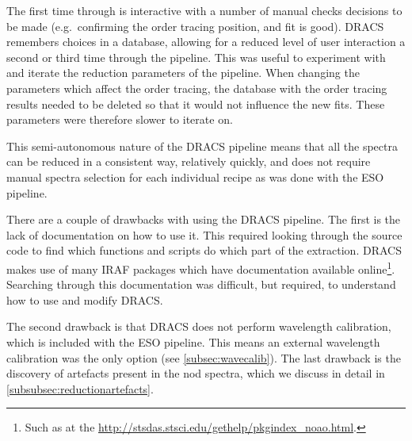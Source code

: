 The first time through is interactive with a number of manual checks decisions to be made (e.g.\ confirming the order tracing position, and fit is good).
{DRACS} remembers choices in a database, allowing for a reduced level of user interaction a second or third time through the pipeline.
This was useful to experiment with and iterate the reduction parameters of the pipeline.
When changing the parameters which affect the order tracing, the database with the order tracing results needed to be deleted so that it would not influence the new fits.
These parameters were therefore slower to iterate on.

This semi-autonomous nature of the {DRACS} pipeline means that all the spectra can be reduced in a consistent way, relatively quickly, and does not require manual spectra selection for each individual recipe as was done with the {ESO} pipeline.

There are a couple of drawbacks with using the {DRACS} pipeline.
The first is the lack of documentation on how to use it.
This required looking through the source code to find which functions and scripts do which part of the extraction.
{DRACS} makes use of many {IRAF} packages which have documentation available online\footnote{Such as at the \href{Space Telescope Science Institute}{http://stsdas.stsci.edu/gethelp/pkgindex\_noao.html}.}.
Searching through this documentation was difficult, but required, to understand how to use and modify {DRACS}.

The second drawback is that {DRACS} does not perform wavelength calibration, which is included with the {ESO} pipeline.
This means an external wavelength calibration was the only option (see \cref{subsec:wavecalib}).
The last drawback is the discovery of artefacts present in the nod spectra, which we discuss in detail in \cref{subsubsec:reductionartefacts}.

